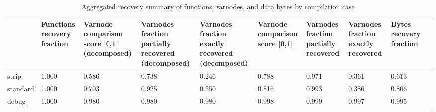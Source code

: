 \begin{table*}[t]
\centering
\caption{Aggregated recovery summary of functions, varnodes, and data bytes by compilation case}
\label{table*:opts-overall-summary}
\begin{tabular}{lp{1.3cm}p{1.3cm}p{1.3cm}p{1.3cm}p{1.3cm}p{1.3cm}p{1.3cm}p{1.3cm}p{1.3cm}}
\toprule
{} &  Functions recovery fraction &  Varnode comparison score [0,1] (decomposed) &  Varnodes fraction partially recovered (decomposed) &  Varnodes fraction exactly recovered (decomposed) &  Varnode comparison score [0,1] &  Varnodes fraction partially recovered &  Varnodes fraction exactly recovered &  Bytes recovery fraction \\
\midrule
strip    &                        1.000 &                                        0.586 &                                              0.738 &                                             0.246 &                           0.788 &                                  0.971 &                                0.361 &                    0.613 \\
standard &                        1.000 &                                        0.703 &                                              0.925 &                                             0.250 &                           0.816 &                                  0.993 &                                0.386 &                    0.806 \\
debug    &                        1.000 &                                        0.980 &                                              0.980 &                                             0.980 &                           0.998 &                                  0.999 &                                0.997 &                    0.995 \\
\bottomrule
\end{tabular}
\end{table*}
